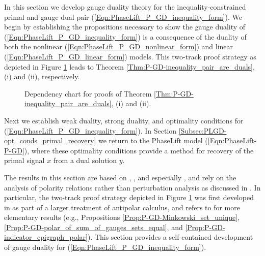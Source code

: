 In this section we develop gauge duality theory for the inequality-constrained primal and gauge dual pair (\ref{Eqn:PhaseLift_P_GD_inequality_form}).  We begin by establishing the propositions necessary to show the gauge duality of (\ref{Eqn:PhaseLift_P_GD_inequality_form}) is a consequence of the duality of both the nonlinear (\ref{Eqn:PhaseLift_P_GD_nonlinear_form}) and linear (\ref{Eqn:PhaseLift_P_GD_linear_form}) models.  This two-track proof strategy as depicted in Figure \ref{Fig:gauge_duality_thm_flowchart} leads to Theorem \ref{Thm:P-GD-inequality_pair_are_duals}, (i) and (ii), respectively.
\begin{figure}[H] 
\centering
\hspace{1cm}
\hspace{2cm}
\caption{Dependency chart for proofs of Theorem \ref{Thm:P-GD-inequality_pair_are_duals}, (i) and (ii).}
\label{Fig:gauge_duality_thm_flowchart}
\end{figure}

Next we establish weak duality, strong duality, and optimality conditions for (\ref{Eqn:PhaseLift_P_GD_inequality_form}).  In Section \ref{Subsec:PLGD-opt_conds_primal_recovery} we return to the PhaseLift model (\ref{Eqn:PhaseLift-P-GD}), where these optimality conditions provide a method for recovery of the primal signal $x$ from a dual solution $y$.


The results in this section are based on \cite{rockafellar1970convex}, \cite{DBLP:journals/mp/Freund87}, and especially \cite{DBLP:journals/siamjo/FriedlanderMP14}, and rely on the analysis of polarity relations rather than perturbation analysis as discussed in \cite{aravkin2017foundations}.    In particular, the two-track proof strategy depicted in Figure \ref{Fig:gauge_duality_thm_flowchart} was first developed in \cite{DBLP:journals/siamjo/FriedlanderMP14} as part of a larger treatment of antipolar calculus, and refers to \cite{rockafellar1970convex} for more elementary results (e.g., Propositions \ref{Prop:P-GD-Minkowski_set_unique}, \ref{Prop:P-GD-polar_of_sum_of_gauges_sets_equal}, and \ref{Prop:P-GD-indicator_epigraph_polar}).  This section provides a self-contained development of gauge duality for (\ref{Eqn:PhaseLift_P_GD_inequality_form}).





